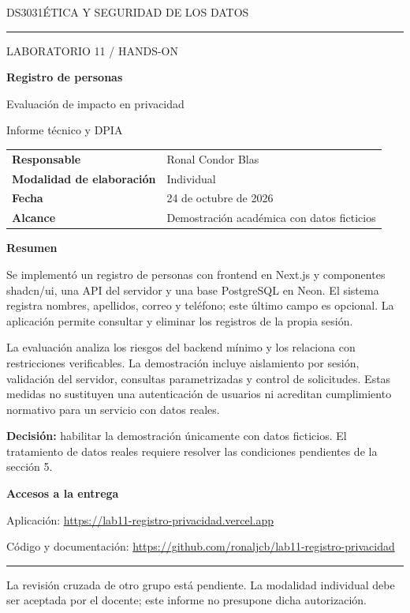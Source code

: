 \documentclass[11pt,a4paper]{article}
\newcommand{\repo}{https://github.com/ronaljcb/lab11-registro-privacidad}
\newcommand{\sitio}{https://lab11-registro-privacidad.vercel.app}
\begin{document}
\thispagestyle{empty}
{\small DS3031\hfill ÉTICA Y SEGURIDAD DE LOS DATOS}

\vspace{1.2cm}\hrule\vspace{1cm}
{\large LABORATORIO 11 / HANDS-ON}

\vspace{.6cm}
{\Huge\bfseries Registro de personas}

\vspace{.35cm}
{\LARGE Evaluación de impacto en privacidad}

\vspace{.8cm}
{\large Informe técnico y DPIA}

\vspace{1.1cm}
\begin{tabular}{@{}ll}
\textbf{Responsable} & Ronal Condor Blas\\[5pt]
\textbf{Modalidad de elaboración} & Individual\\[5pt]
\textbf{Fecha} & 24 de octubre de 2026\\[5pt]
\textbf{Alcance} & Demostración académica con datos ficticios\\
\end{tabular}

\vspace{1cm}
\textbf{Resumen}

Se implementó un registro de personas con frontend en Next.js y componentes shadcn/ui, una API del servidor y una base PostgreSQL en Neon. El sistema registra nombres, apellidos, correo y teléfono; este último campo es opcional. La aplicación permite consultar y eliminar los registros de la propia sesión.

La evaluación analiza los riesgos del backend mínimo y los relaciona con restricciones verificables. La demostración incluye aislamiento por sesión, validación del servidor, consultas parametrizadas y control de solicitudes. Estas medidas no sustituyen una autenticación de usuarios ni acreditan cumplimiento normativo para un servicio con datos reales.

\textbf{Decisión:} habilitar la demostración únicamente con datos ficticios. El tratamiento de datos reales requiere resolver las condiciones pendientes de la sección 5.

\vfill
\textbf{Accesos a la entrega}

Aplicación: \url{\sitio}

Código y documentación: \url{\repo}

\vspace{.5cm}\hrule
{\footnotesize La revisión cruzada de otro grupo está pendiente. La modalidad individual debe ser aceptada por el docente; este informe no presupone dicha autorización.}
\end{document}
